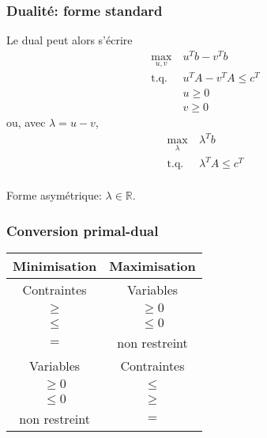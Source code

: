 \documentclass[usepdftitle=false]{beamer}
\def\RR{\mathbb{R}}
\begin{document}
\begin{frame}
\frametitle{Dualité: forme standard}

Le dual peut alors s'écrire
\begin{align*}
\max_{u, v} \ & u^T b - v^T b \\
\mbox{t.q. } & u^T A - v^T A \leq c^T \\
& u \geq 0 \\
& v \geq 0
\end{align*}
ou, avec $\lambda = u - v$,
\begin{align*}
\max_{\lambda} \ & \lambda^T b \\
\mbox{t.q. } & \lambda^T A \leq c^T \\
\end{align*}

Forme asymétrique: $\lambda \in \RR$.

\end{frame}

\begin{frame}
\frametitle{Conversion primal-dual}

\begin{center}
\begin{tabular}{|c|c|}
\hline
\hline
{\bf Minimisation} & {\bf Maximisation} \\
\hline
\hline
Contraintes & Variables \\
$\geq$ & $\geq 0$ \\
$\leq$ & $\leq 0$ \\
$=$ & non restreint \\
\hline
Variables & Contraintes \\
\hline
$\geq 0$ & $\leq$ \\
$\leq 0$ & $\geq$ \\
non restreint & $=$ \\
\hline
\end{tabular}
\end{center}

\end{frame}
\end{document}

